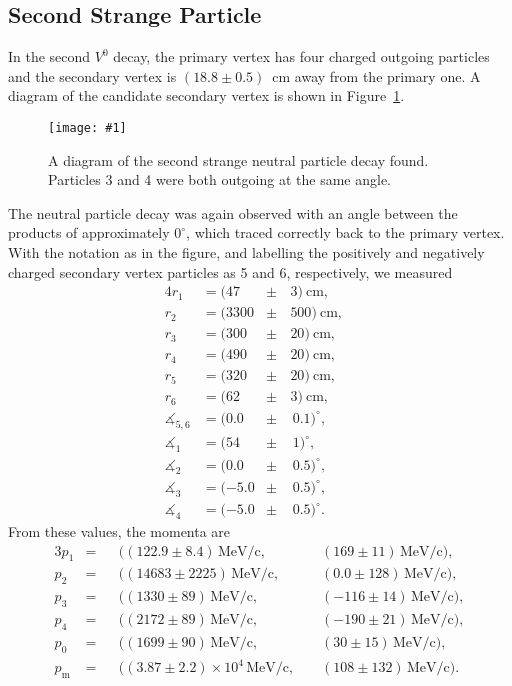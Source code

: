 \documentclass[twocolumn]{article}
\newcommand{\insertFigure}[1]{%
   \texttt{[image: \#1]}%
}
\begin{document}
\subsection{Second Strange Particle}
In the second $V^0$ decay, the primary vertex has four charged outgoing particles and the secondary vertex is $(18.8 \pm 0.5)$~cm away from the primary one. A diagram of the candidate secondary vertex is shown in Figure~\ref{fig:primary2}. 
\begin{figure} [!h]
	\insertFigure{Images/primary_2.png}
	\caption{A diagram of the second strange neutral particle decay found. Particles 3 and 4 were both outgoing at the same angle.}
	\label{fig:primary2}
\end{figure}
The neutral particle decay was again observed with an angle between the products of approximately $0^\circ$, which traced correctly back to the primary vertex. With the notation as in the figure, and labelling the positively and negatively charged secondary vertex particles as 5 and 6, respectively, we measured
\begin{alignat*}{4}
	r_1 &= (47 &\pm \, &3)~\text{cm},\\
	r_2 &= (3300 &\pm \, &500)~\text{cm},\\
	r_3 &= (300 &\pm \, &20)~\text{cm},\\
	r_4 &= (490 &\pm \, &20)~\text{cm},\\
	r_5 &= (320 &\pm \, &20)~\text{cm},\\
	r_6 &= (62&\pm \, &3)~\text{cm},\\
	\measuredangle_{5,6} &= (0.0 &\pm & \, 0.1)^{\circ},&\\
	\measuredangle_{1} &= (54 &\pm & \, 1)^{\circ},&\\
	\measuredangle_{2} &= (0.0 &\pm & \, 0.5)^{\circ},&\\
	\measuredangle_{3} &= (-5.0 &\pm & \, 0.5)^{\circ},&\\
	\measuredangle_{4} &= (-5.0 &\pm & \, 0.5)^{\circ}.&
\end{alignat*} 
From these values, the momenta are
\begin{alignat*}{3}
	p_1 &= &&((122.9 \pm 8.4)\, \text{MeV/c},\hspace{3pt} && (169 \pm 11)\, \text{MeV/c}),\\
	p_2 &= &&((14683 \pm 2225)\, \text{MeV/c},\hspace{3pt} && (0.0 \pm 128)\, \text{MeV/c}),\\
	p_3 &= &&((1330 \pm 89)\, \text{MeV/c},\hspace{3pt} && (-116 \pm 14)\, \text{MeV/c}),\\
	p_4 &= &&((2172 \pm 89)\, \text{MeV/c},\hspace{3pt} && (-190 \pm 21)\, \text{MeV/c}),\\
	p_{0} &= &&((1699 \pm 90)\, \text{MeV/c},\hspace{3pt} && (30 \pm 15)\, \text{MeV/c}),\\[6pt]
	p_{\text{m}} &= &&((3.87 \pm 2.2)\times 10^4\, \text{MeV/c},\hspace{3pt} && (108 \pm 132)\, \text{MeV/c}).
\end{alignat*}
\end{document}
